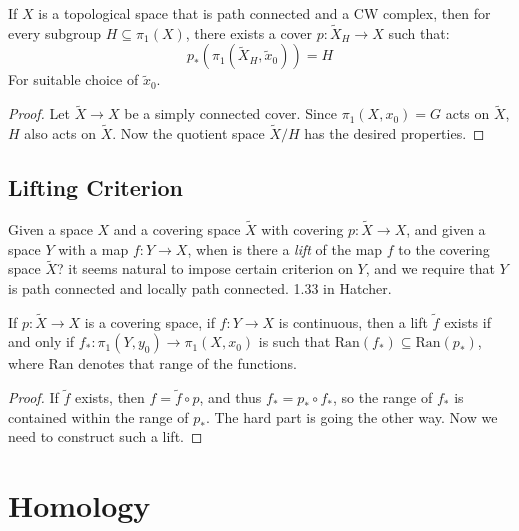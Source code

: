     \begin{theorem}
        If $X$ is a topological space that is path connected
        and a CW complex, then for every subgroup
        $H\subseteq\pi_{1}(X)$, there exists a cover
        $p:\tilde{X}_{H}\rightarrow{X}$ such that:
        \begin{equation}
            p_{*}(\pi_{1}(\tilde{X}_{H},\tilde{x}_{0}))=H
        \end{equation}
        For suitable choice of $\tilde{x}_{0}$.
    \end{theorem}
    \begin{proof}
        Let $\tilde{X}\rightarrow{X}$ be a simply
        connected cover. Since $\pi_{1}(X,x_{0})=G$ acts on
        $\tilde{X}$, $H$ also acts on $\tilde{X}$. Now the
        quotient space $\tilde{X}/H$ has the desired
        properties.
    \end{proof}
    \subsection{Lifting Criterion}
        Given a space $X$ and a covering space
        $\tilde{X}$ with covering
        $p:\tilde{X}\rightarrow{X}$, and given a space
        $Y$ with a map $f:Y\rightarrow{X}$, when is there a
        \textit{lift} of the map $f$ to the covering
        space $\tilde{X}$? it seems natural to impose certain
        criterion on $Y$, and we require that $Y$ is
        path connected and locally path connected.
        1.33 in Hatcher.
        \begin{theorem}
            If $p:\tilde{X}\rightarrow{X}$ is a covering space,
            if $f:Y\rightarrow{X}$ is continuous, then a
            lift $\tilde{f}$ exists if and only if
            $f_{*}:\pi_{1}(Y,y_{0})\rightarrow\pi_{1}(X,x_{0})$
            is such that
            $\textrm{Ran}(f_{*})\subseteq\textrm{Ran}(p_{*})$,
            where $\textrm{Ran}$ denotes that range of the
            functions.
        \end{theorem}
        \begin{proof}
            If $\tilde{f}$ exists, then
            $f=\tilde{f}\circ{p}$, and thus
            $f_{*}=p_{*}\circ{f}_{*}$, so the range of
            $f_{*}$ is contained within the range of
            $p_{*}$. The hard part is going the other way.
            Now we need to construct such a lift.
        \end{proof}
\section{Homology}
